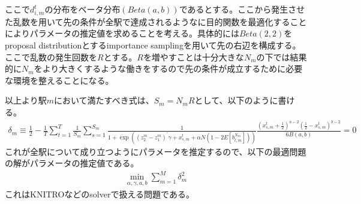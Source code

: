 \documentclass{jsarticle}
\begin{document}
ここで$d_{i,m}^t$の分布をベータ分布$(Beta(a, b))$であるとする。ここから発生させた乱数を用いて先の条件が全駅で達成されるようなに目的関数を最適化することによりパラメータの推定値を求めることを考える。具体的には$Beta(2,2)$をproposal distributionとするimportance samplingを用いて先の右辺を構成する。ここで乱数の発生回数を$R$とする。$R$を増やすことは十分大きな$N_m$の下では結果的に$N_m$をより大きくするような働きをするので先の条件が成立するために必要な環境を整えることになる。

以上より駅$m$において満たすべき式は、$S_m = N_m R$として、以下のように書ける。
\begin{align*}
	\delta_m \equiv \frac{1}{2} - \frac{1}{T}\sum_{t = 1}^T \frac{1}{S_m}\sum_{s = 1}^{S_m} \frac{1}{1 + \exp\left( (z_2^m - z_1^m)^{'}\gamma + x_{s,m}^t + \alpha N \left(1 - 2E[b_{t,m}^{N_m}]\right) \right)} \frac{\left(x_{s,m}^t + \frac{1}{2}\right)^{a - 2} \left(\frac{1}{2} - x_{s,m}^t \right)^{b-2}}{6B(a, b)} = 0
\end{align*}
これが全駅について成り立つようにパラメータを推定するので、以下の最適問題の解がパラメータの推定値である。
\begin{align*}
	\min_{\alpha, \gamma, a, b} \sum_{m = 1}^M \delta_m^2
\end{align*}
これはKNITROなどのsolverで扱える問題である。
\end{document}
